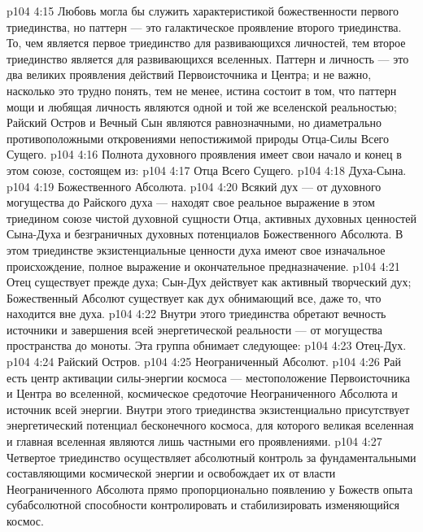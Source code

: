 \vs p104 4:15 Любовь могла бы служить характеристикой божественности первого триединства, но паттерн --- это галактическое проявление второго триединства. То, чем является первое триединство для развивающихся личностей, тем второе триединство является для развивающихся вселенных. Паттерн и личность --- это два великих проявления действий Первоисточника и Центра; и не важно, насколько это трудно понять, тем не менее, истина состоит в том, что паттерн мощи и любящая личность являются одной и той же вселенской реальностью; Райский Остров и Вечный Сын являются равнозначными, но диаметрально противоположными откровениями непостижимой природы Отца\hyp{}Силы Всего Сущего.
\vs p104 4:16 \pc {} Полнота духовного проявления имеет свои начало и конец в этом союзе, состоящем из:
\vs p104 4:17 \bibnobreakspace Отца Всего Сущего.
\vs p104 4:18 \bibnobreakspace Духа\hyp{}Сына.
\vs p104 4:19 \bibnobreakspace Божественного Абсолюта.
\vs p104 4:20 \pc Всякий дух --- от духовного могущества до Райского духа --- находят свое реальное выражение в этом триедином союзе чистой духовной сущности Отца, активных духовных ценностей Сына\hyp{}Духа и безграничных духовных потенциалов Божественного Абсолюта. В этом триединстве экзистенциальные ценности духа имеют свое изначальное происхождение, полное выражение и окончательное предназначение.
\vs p104 4:21 Отец существует прежде духа; Сын\hyp{}Дух действует как активный творческий дух; Божественный Абсолют существует как дух обнимающий все, даже то, что находится вне духа.
\vs p104 4:22 \pc {} Внутри этого триединства обретают вечность источники и завершения всей энергетической реальности --- от могущества пространства до моноты. Эта группа обнимает следующее:
\vs p104 4:23 \bibnobreakspace Отец\hyp{}Дух.
\vs p104 4:24 \bibnobreakspace Райский Остров.
\vs p104 4:25 \bibnobreakspace Неограниченный Абсолют.
\vs p104 4:26 \pc Рай есть центр активации силы\hyp{}энергии космоса --- местоположение Первоисточника и Центра во вселенной, космическое средоточие Неограниченного Абсолюта и источник всей энергии. Внутри этого триединства экзистенциально присутствует энергетический потенциал бесконечного космоса, для которого великая вселенная и главная вселенная являются лишь частными его проявлениями.
\vs p104 4:27 Четвертое триединство осуществляет абсолютный контроль за фундаментальными составляющими космической энергии и освобождает их от власти Неограниченного Абсолюта прямо пропорционально появлению у Божеств опыта субабсолютной способности контролировать и стабилизировать изменяющийся космос.
